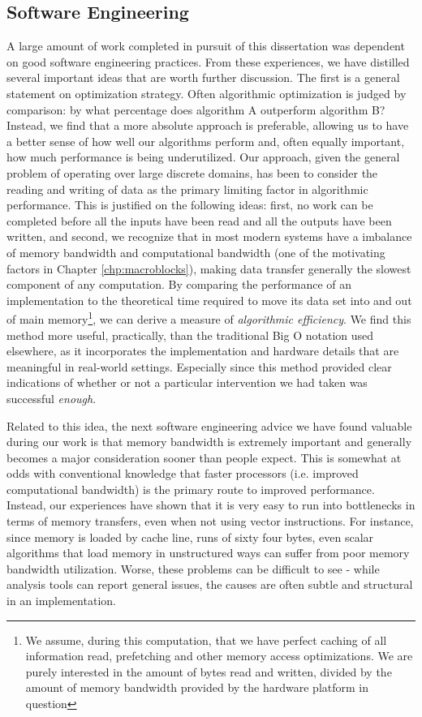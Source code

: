 \subsection{Software Engineering}

A large amount of work completed in pursuit of this dissertation was
dependent on good software engineering practices. From these
experiences, we have distilled several important ideas that are worth
further discussion. The first is a general statement on optimization
strategy. Often algorithmic optimization is judged by comparison: by
what percentage does algorithm A outperform algorithm B? Instead, we
find that a more absolute approach is preferable, allowing us to have
a better sense of how well our algorithms perform and, often equally
important, how much performance is being underutilized. Our approach,
given the general problem of operating over large discrete domains,
has been to consider the reading and writing of data as the primary
limiting factor in algorithmic performance. This is justified on the
following ideas: first, no work can be completed before all the inputs
have been read and all the outputs have been written, and second, we
recognize that in most modern systems have a imbalance of memory
bandwidth and computational bandwidth (one of the motivating factors
in Chapter \ref{chp:macroblocks}), making data transfer generally the
slowest component of any computation. By comparing the performance of
an implementation to the theoretical time required to move its data
set into and out of main memory\footnote{We assume, during this
  computation, that we have perfect caching of all information read,
  prefetching and other memory access optimizations. We are purely
  interested in the amount of bytes read and written, divided by the
  amount of memory bandwidth provided by the hardware platform in
  question}, we can derive a measure of \textit{algorithmic
  efficiency}. We find this method more useful, practically, than the
traditional Big O notation used elsewhere, as it incorporates the
implementation and hardware details that are meaningful in real-world
settings. Especially since this method provided clear indications of
whether or not a particular intervention we had taken was successful
\textit{enough}.

Related to this idea, the next software engineering advice we have
found valuable during our work is that memory bandwidth is extremely
important and generally becomes a major consideration sooner than
people expect. This is somewhat at odds with conventional knowledge
that faster processors (i.e. improved computational bandwidth) is the
primary route to improved performance. Instead, our experiences have
shown that it is very easy to run into bottlenecks in terms of memory
transfers, even when not using vector instructions. For instance,
since memory is loaded by cache line, runs of sixty four bytes,
even scalar algorithms that load memory in unstructured ways can
suffer from poor memory bandwidth utilization. Worse, these problems
can be difficult to see - while analysis tools can report general
issues, the causes are often subtle and structural in an implementation.  

